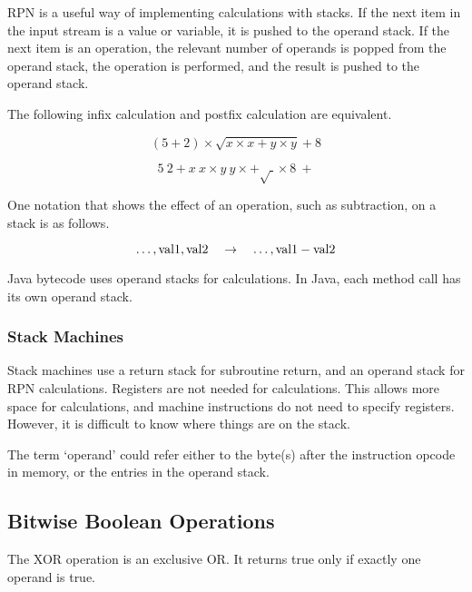 RPN is a useful way of implementing calculations with stacks.
If the next item in the input stream is a value or variable, it is pushed to the operand stack.
If the next item is an operation, the relevant number of operands is popped from the operand stack, the operation is performed, and the result is pushed to the operand stack.

The following infix calculation and postfix calculation are equivalent.

\begin{equation*}
  \left( 5 + 2 \right) \times \sqrt{ x \times x + y \times y } + 8
\end{equation*}

\begin{equation*}
  5 \> 2 + x \> x \times y \> y \times + \sqrt{\>} \times 8 \> +
\end{equation*}

One notation that shows the effect of an operation, such as subtraction, on a stack is as follows.

\begin{equation*}
  \ldots, \textnormal{val1}, \textnormal{val2} \quad \rightarrow \quad \ldots, \textnormal{val1} - \textnormal{val2}
\end{equation*}

Java bytecode uses operand stacks for calculations.
In Java, each method call has its own operand stack.

\subsubsection{Stack Machines}

Stack machines use a return stack for subroutine return, and an operand stack for RPN calculations.
Registers are not needed for calculations.
This allows more space for calculations, and machine instructions do not need to specify registers.
However, it is difficult to know where things are on the stack.

The term `operand' could refer either to the byte(s) after the instruction opcode in memory, or the entries in the operand stack.

\subsection{Bitwise Boolean Operations}

The XOR operation is an exclusive OR.\@
It returns true only if exactly one operand is true.

